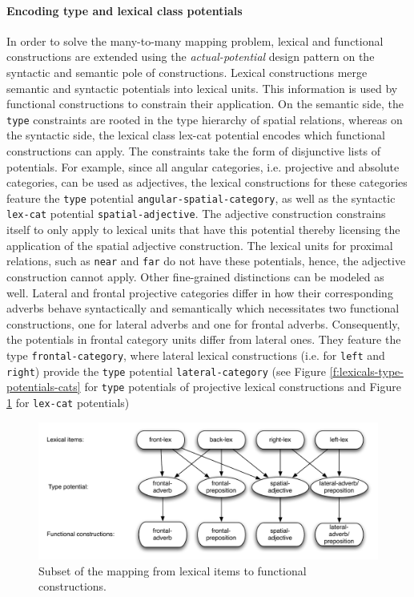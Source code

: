 \paragraph*{Encoding type and lexical class potentials}
In order to solve the many-to-many mapping problem,
lexical and functional constructions are 
extended using the \emph{actual-potential} design pattern 
on the syntactic and semantic pole of constructions.
Lexical constructions merge semantic and 
syntactic potentials into lexical units. This 
information is used by functional constructions 
to constrain their application. On the 
semantic side, the {\footnotesize\tt type} constraints are rooted 
in the type hierarchy of spatial relations, whereas on the
syntactic side, the lexical class {lex-cat} potential encodes
which functional constructions can apply. 
The constraints take the form of disjunctive lists of potentials.
For example, since all angular categories, i.e. projective and absolute
categories, can be used as adjectives, the lexical constructions for these 
categories feature the {\footnotesize\tt type} potential {\footnotesize\tt angular-spatial-category}, 
as well as the syntactic {\footnotesize\tt lex-cat} potential 
{\footnotesize\tt spatial-adjective}. The adjective construction
constrains itself to only apply to lexical units that have this 
potential thereby licensing the application of the spatial adjective
construction. The lexical units for proximal relations, such
as {\footnotesize\tt near} and {\footnotesize\tt far} do not have these potentials, hence,
the adjective construction cannot apply.
Other fine-grained distinctions can be modeled as well.
Lateral and frontal projective categories differ in how their 
corresponding adverbs behave syntactically and semantically
which necessitates two functional constructions, one for lateral adverbs and one 
for frontal adverbs. Consequently, the potentials in frontal category units 
differ from lateral ones. They feature the type {\footnotesize\tt frontal-category}, 
where lateral lexical constructions (i.e. for {\footnotesize\tt left} and {\footnotesize\tt right})
provide the {\footnotesize\tt type} potential {\footnotesize\tt lateral-category}
(see Figure \ref{f:lexicals-type-potentials-cats} 
for {\footnotesize\tt type}  potentials of projective lexical constructions and
Figure \ref{f:lexicals-lex-cat-potentials-cats}  for {\footnotesize\tt lex-cat} potentials)

\begin{figure}
\includegraphics[width=\columnwidth]{figs/lexicals-lex-cat-potentials-cats}
\caption{Subset of the mapping from lexical items to functional constructions.}
\label{f:lexicals-lex-cat-potentials-cats}
\end{figure}

